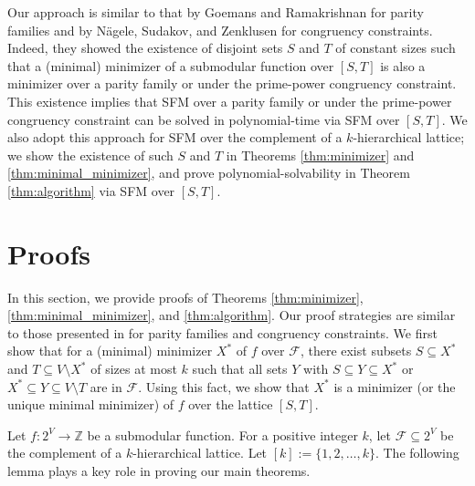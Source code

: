 \documentclass[11pt,letterpaper]{article}
\theoremstyle{plain}
\theoremstyle{definition}
\begin{document}
Our approach is similar to that by Goemans and Ramakrishnan \cite{goemans1995} for parity families and by N\"{a}gele, Sudakov, and Zenklusen \cite{nagele2019} for congruency constraints.
Indeed, they showed the existence of disjoint sets $S$ and $T$ of constant sizes such that a (minimal) minimizer of a submodular function over $[S,T]$ is also a minimizer over a parity family or under the prime-power congruency constraint.
This existence implies that SFM over a parity family or under the prime-power congruency constraint can be solved in polynomial-time via SFM over $[S,T]$.
We also adopt this approach for SFM over the complement of a $k$-hierarchical lattice; we show the existence of such $S$ and $T$ in Theorems \ref{thm:minimizer} and \ref{thm:minimal_minimizer}, and prove polynomial-solvability in Theorem \ref{thm:algorithm} via SFM over $[S,T]$. 

\section{Proofs}
\label{sec:proof}
In this section, we provide proofs of Theorems \ref{thm:minimizer}, \ref{thm:minimal_minimizer}, and \ref{thm:algorithm}.
Our proof strategies are similar to those presented in \cite{goemans1995,nagele2019} for parity families and congruency constraints.
We first show that for a (minimal) minimizer $X^*$ of $f$ over $\mathcal{F}$, there exist subsets $S\subseteq X^*$ and $T\subseteq V\setminus X^*$ of sizes at most $k$ such that all sets $Y$ with $S\subseteq Y\subseteq X^*$ or $X^*\subseteq Y\subseteq V\setminus T$ are in $\mathcal{F}$.
Using this fact, we show that $X^*$ is a minimizer (or the unique minimal minimizer) of $f$ over the lattice $[S,T]$.

Let $f:2^V\to \mathbb{Z}$ be a submodular function.
For a positive integer $k$, let $\mathcal{F}\subseteq 2^V$ be the complement of a $k$-hierarchical lattice.
Let $[k]:=\{1,2,\ldots,k\}$.
The following lemma plays a key role in proving our main theorems.
\end{document}
